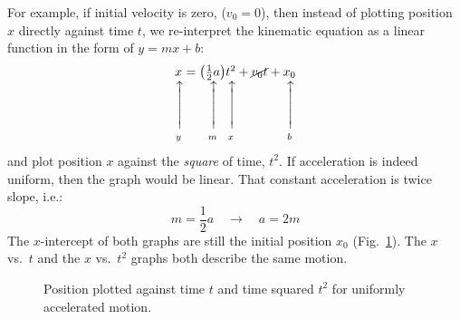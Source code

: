 \documentclass{../../oss-handout}
\makeatletter
\newcommand\vertarrowbox[2]{%
    \begin{array}[t]{@{}c@{}} #1 \\
    \rotatebox{90}{$\xrightarrow{\hphantom{abcdefgh}}$} \\[-1ex]
    \mathclap{\scriptstyle\text{#2}}%
    \end{array}}
\makeatother
\begin{document}
For example, if initial velocity is zero, ($v_0=0$), then instead of plotting
position $x$ directly against time $t$, we re-interpret the kinematic equation
as a linear function in the form of $y=mx+b$:
\begin{equation}
  \vertarrowbox{x}{$y$}=\vertarrowbox{\left(\frac12 a\right)}{$m$}
  \vertarrowbox{t^2}{$x$}+
  \cancel{v_0t}+
  \vertarrowbox{x_0}{$b$}
\end{equation}
and plot position $x$ against the \emph{square} of time, $t^2$. If acceleration
is indeed uniform, then the graph would be linear. That constant acceleration is
twice slope, i.e.:
\begin{equation*}
  m=\frac12 a\quad\rightarrow\quad a=2m
\end{equation*}
The $x$-intercept of both graphs are still the initial position $x_0$
(Fig.~\ref{switch1}). The $x$ vs.\ $t$ and the $x$ vs.\ $t^2$ graphs both
describe the same motion.
\begin{figure}[!ht]
  \centering
  \hspace{.15in}
  \caption{Position plotted against time $t$ and time squared $t^2$ for
    uniformly accelerated motion.}
  \label{switch1}
\end{figure} 
\end{document}
